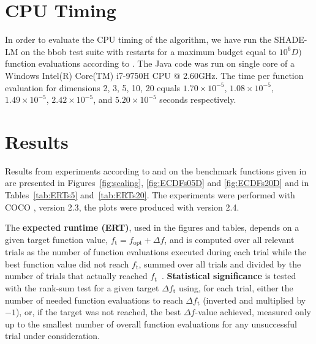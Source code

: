 \documentclass[sigconf]{acmart}
\newcommand{\Df}{\ensuremath{\Delta f}}
\newcommand{\fopt}{\ensuremath{f_\mathrm{opt}}}
\newcommand{\ftarget}{\ensuremath{f_\mathrm{t}}}
\begin{document}
%
\section{CPU Timing}
In order to evaluate the CPU timing of the algorithm, we have run the {SHADE-LM}
on the {bbob test suite \cite{hansen2010fun}} with restarts for a maximum budget
equal to {$10^6D)$} function evaluations according to \cite{hansen2016exp}.
The {Java} code was run on  single core of a {Windows Intel(R) Core(TM) i7-9750H CPU @ 2.60GHz}.
The time per function evaluation for dimensions 2, 3, 5, 10, 20 equals
$1.70\times10^{-5}$,
{$1.08\times10^{-5}$},
{$1.49\times10^{-5}$},
{$2.42\times10^{-5}$},
and {$5.20\times10^{-5}$}
seconds respectively. 

\section{Results}

Results from experiments according to \cite{hansen2016exp} and \cite{hansen2016perfass} on the
benchmark functions given in \cite{wp200901_2010,hansen2010fun} are
presented in Figures~\ref{fig:scaling}, \ref{fig:ECDFs05D} and
\ref{fig:ECDFs20D} and in Tables~\ref{tab:ERTs5} and~\ref{tab:ERTs20}.
The experiments were performed with COCO \cite{hansen2020cocoplat}, version
{2.3}, the plots were produced with version {2.4}.

The \textbf{expected runtime (ERT)}, used in the figures and tables,
depends on a given target function value, $\ftarget=\fopt+\Df$, and is
computed over all relevant trials as the number of function
evaluations executed during each trial while the best function value
did not reach \ftarget, summed over all trials and divided by the
number of trials that actually reached \ftarget\
\cite{hansen2012exp,price1997dev}.  \textbf{Statistical significance}
is tested with the rank-sum test for a given target $\Delta\ftarget$
using, for each trial,
either the number of needed function evaluations to reach
$\Delta\ftarget$ (inverted and multiplied by $-1$), or, if the target
was not reached, the best $\Df$-value achieved, measured only up to
the smallest number of overall function evaluations for any
unsuccessful trial under consideration.
\end{document}
